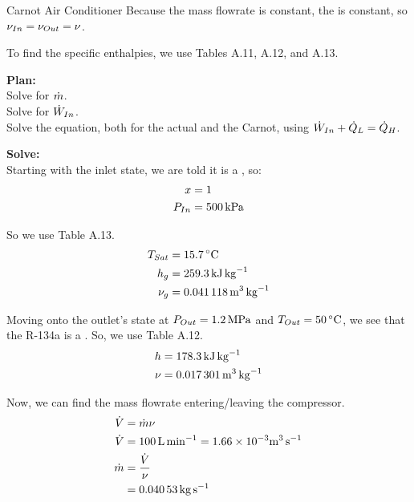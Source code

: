 \begin{example}{Carnot Air Conditioner}
  Because the mass flowrate is constant, the  is constant, so $\nu_{In} = \nu_{Out} = \nu$.

  To find the specific enthalpies, we use Tables A.11, A.12, and A.13.

  \textbf{Plan:} \\
  Solve for $\dot{m}$. \\
  Solve for $\dot{W}_{In}$. \\
  Solve the  equation, both for the actual and the Carnot, using $\dot{W}_{In} + \dot{Q}_{L} = \dot{Q}_{H}$.

  \textbf{Solve:} \\
  Starting with the inlet state, we are told it is a , so:
  \begin{align*}
    x &= 1 \\
    P_{In} &= \SI{500}{\kilo\pascal}
  \end{align*}

  So we use Table A.13.
  \begin{align*}
    \Temp_{Sat} &= \SI{15.7}{\degreeCelsius} \\
    \Vapor{\SpecificEnthalpy} &= \SI{259.3}{\kilo\joule\per\kilo\gram} \\
    \Vapor{\SpecificVolume} &= \SI{0.041118}{\meter\cubed\per\kilo\gram}
  \end{align*}

  Moving onto the outlet's state at $P_{Out} = \SI{1.2}{\mega\pascal}$ and $\Temp_{Out} = \SI{50}{\degreeCelsius}$, we see that the R-134a is a .
  So, we use Table A.12.
  \begin{align*}
    h &= \SI{178.3}{\kilo\joule\per\kilo\gram} \\
    \nu &= \SI{0.017301}{\meter\cubed\per\kilo\gram}
  \end{align*}

  Now, we can find the mass flowrate entering/leaving the compressor.
  \begin{align*}
    \dot{V} &= \dot{m} \nu \\
    \dot{V} &= \SI{100}{\liter\per\minute} = 1.66 \times 10^{-3} \si{\meter\cubed\per\second} \\
    \dot{m} &= \frac{\dot{V}}{\nu} \\
                       &= \SI{0.04053}{\kilo\gram\per\second}
  \end{align*}


\end{example}
